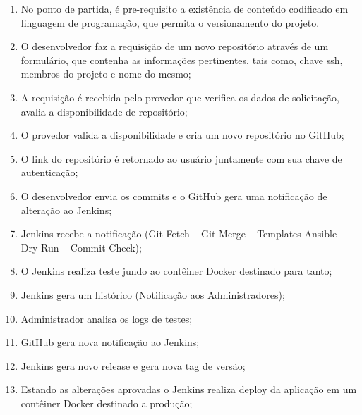 \begin{enumerate}
	\item No ponto de partida, é pre-requisito a existência de conteúdo codificado em linguagem de programação, que permita o versionamento do projeto.
	\item O desenvolvedor faz a requisição de um novo repositório através de um formulário, que contenha as informações pertinentes, tais como, chave ssh, membros do projeto e nome do mesmo;
	\item A requisição é recebida pelo provedor que verifica os dados de solicitação, avalia a disponibilidade de repositório;
	\item O provedor valida a disponibilidade e cria um novo repositório no GitHub;
	\item O link do repositório é retornado ao usuário juntamente com sua chave de autenticação;
	\item O desenvolvedor envia os commits e o GitHub gera uma notificação de alteração ao Jenkins;
	\item Jenkins recebe a notificação (Git Fetch – Git Merge – Templates Ansible – Dry Run – Commit Check);
	\item O Jenkins realiza teste jundo ao contêiner Docker destinado para tanto;
	\item Jenkins gera um histórico (Notificação aos Administradores);
	\item Administrador analisa os logs de testes;
	\item GitHub gera nova notificação ao Jenkins;
	\item Jenkins gera novo release e gera nova tag de versão;
	\item Estando as alterações aprovadas o Jenkins realiza deploy da aplicação em um contêiner Docker destinado a produção;
\end{enumerate}
















